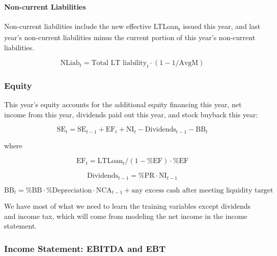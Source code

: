 \documentclass[12pt,a4paper]{article}
\begin{document}
\paragraph{Non-current Liabilities}

Non-current liabilities include the new effective
LTLoan\textsubscript{t} issued this year, and last year's non-current
liabilities minus the current portion of this year's non-current
liabilities.

\begin{equation}\label{eq:nliab}
\text{NLiab}_t = \text{Total LT liability}_t \cdot (1 - 1/\text{AvgM})
\end{equation}

\subsubsection{Equity}

This year's equity accounts for the additional equity financing this
year, net income from this year, dividends paid out this year, and stock
buyback this year:

\begin{equation}\label{eq:stockholder_equity}
\text{SE}_t = \text{SE}_{t-1} + \text{EF}_t + \text{NI}_t - \text{Dividends}_{t-1} - \text{BB}_t
\end{equation}

where

\begin{equation}\label{eq:ef}
\text{EF}_t = \text{LTLoan}_t / (1 - \text{\%EF}) \cdot \text{\%EF}
\end{equation}

\begin{equation}\label{eq:dividends}
\text{Dividends}_{t-1} = \text{\%PR} \cdot \text{NI}_{t-1}
\end{equation}

\begin{equation}\label{eq:bb}
\text{BB}_t = \text{\%BB} \cdot \text{\%Depreciation} \cdot \text{NCA}_{t-1} + \text{any excess cash after meeting liquidity target}
\end{equation}

We have most of what we need to learn the training variables except
dividends and income tax, which will come from modeling the net income
in the income statement.

\subsubsection{Income Statement: EBITDA and EBT}
\end{document}
